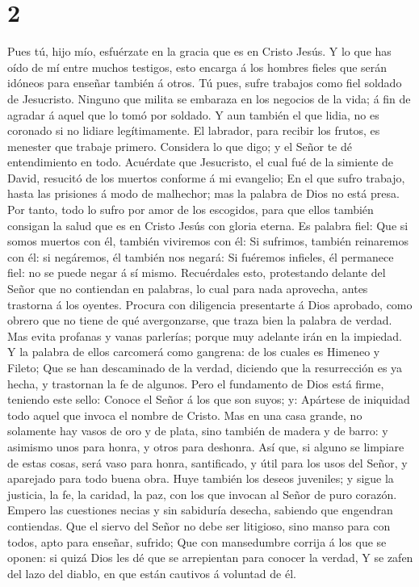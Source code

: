 \hypertarget{section-1}{%
\section{2}\label{section-1}}

 Pues tú, hijo mío, esfuérzate en la gracia que es en Cristo
Jesús.  Y lo que has oído de mí entre muchos testigos, esto
encarga á los hombres fieles que serán idóneos para enseñar también á
otros.  Tú pues, sufre trabajos como fiel soldado de
Jesucristo.  Ninguno que milita se embaraza en los negocios
de la vida; á fin de agradar á aquel que lo tomó por soldado.
 Y aun también el que lidia, no es coronado si no lidiare
legítimamente.  El labrador, para recibir los frutos, es
menester que trabaje primero.  Considera lo que digo; y el
Señor te dé entendimiento en todo.  Acuérdate que
Jesucristo, el cual fué de la simiente de David, resucitó de los muertos
conforme á mi evangelio;  En el que sufro trabajo, hasta las
prisiones á modo de malhechor; mas la palabra de Dios no está presa.
 Por tanto, todo lo sufro por amor de los escogidos, para
que ellos también consigan la salud que es en Cristo Jesús con gloria
eterna.  Es palabra fiel: Que si somos muertos con él,
también viviremos con él:  Si sufrimos, también reinaremos
con él: si negáremos, él también nos negará:  Si fuéremos
infieles, él permanece fiel: no se puede negar á sí mismo. 
Recuérdales esto, protestando delante del Señor que no contiendan en
palabras, lo cual para nada aprovecha, antes trastorna á los oyentes.
 Procura con diligencia presentarte á Dios aprobado, como
obrero que no tiene de qué avergonzarse, que traza bien la palabra de
verdad.  Mas evita profanas y vanas parlerías; porque muy
adelante irán en la impiedad.  Y la palabra de ellos
carcomerá como gangrena: de los cuales es Himeneo y Fileto;
 Que se han descaminado de la verdad, diciendo que la
resurrección es ya hecha, y trastornan la fe de algunos. 
Pero el fundamento de Dios está firme, teniendo este sello: Conoce el
Señor á los que son suyos; y: Apártese de iniquidad todo aquel que
invoca el nombre de Cristo.  Mas en una casa grande, no
solamente hay vasos de oro y de plata, sino también de madera y de
barro: y asimismo unos para honra, y otros para deshonra. 
Así que, si alguno se limpiare de estas cosas, será vaso para honra,
santificado, y útil para los usos del Señor, y aparejado para todo buena
obra.  Huye también los deseos juveniles; y sigue la
justicia, la fe, la caridad, la paz, con los que invocan al Señor de
puro corazón.  Empero las cuestiones necias y sin sabiduría
desecha, sabiendo que engendran contiendas.  Que el siervo
del Señor no debe ser litigioso, sino manso para con todos, apto para
enseñar, sufrido;  Que con mansedumbre corrija á los que se
oponen: si quizá Dios les dé que se arrepientan para conocer la verdad,
 Y se zafen del lazo del diablo, en que están cautivos á
voluntad de él.

